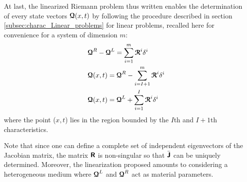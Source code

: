 At last, the linearized Riemann problem thus written enables the determination of every state vectors ${\boldsymbol{\mathcal{Q}}}(x,t)$ by following the procedure described in section \ref{subsec:charac_Linear_problems} for linear problems, recalled here for convenience for a system of dimension $m$:
\begin{equation}
  \label{eq:approx_RS}
  \begin{aligned}
    &  {\boldsymbol{\mathcal{Q}}}^R-{\boldsymbol{\mathcal{Q}}}^L=\sum_{i=1}^{m} {\boldsymbol{\mathcal{R}}}^i\delta^i \\
    &  {\boldsymbol{\mathcal{Q}}}(x,t) ={\boldsymbol{\mathcal{Q}}}^R -\sum_{i=I+1}^{m} {\boldsymbol{\mathcal{R}}}^i\delta^i \\
    &  {\boldsymbol{\mathcal{Q}}}(x,t) ={\boldsymbol{\mathcal{Q}}}^L+ \sum_{i=1}^{I} {\boldsymbol{\mathcal{R}}}^i\delta^i
  \end{aligned}
\end{equation}
where the point ($x,t$) lies in the region bounded by the $I$th and $I+1$th characteristics.

\begin{remark}
  Note that since one can define a complete set of independent eigenvectors of the Jacobian matrix, the matrix $\boldsymbol{\mathsf{R}}$ is non-singular so that $\bar{\boldsymbol{\mathsf{J}}}$ can be uniquely determined. Moreover, the linearization proposed amounts to considering a heterogeneous medium where ${\boldsymbol{\mathcal{Q}}}^{L}$ and ${\boldsymbol{\mathcal{Q}}}^R$ act as material parameters.
\end{remark}

